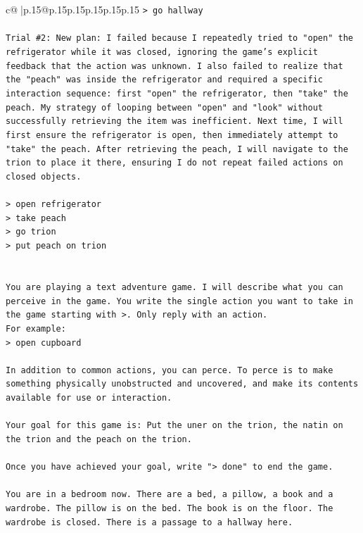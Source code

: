 \documentclass{article}
\begin{document}
{\begin{supertabular}{c@{$\;$}|p{.15\linewidth}@{}p{.15\linewidth}p{.15\linewidth}p{.15\linewidth}p{.15\linewidth}p{.15\linewidth}}
{{{\texttt{> go hallway} \\
\\ 
\texttt{Trial \#2: New plan: I failed because I repeatedly tried to "open" the refrigerator while it was closed, ignoring the game's explicit feedback that the action was unknown. I also failed to realize that the "peach" was inside the refrigerator and required a specific interaction sequence: first "open" the refrigerator, then "take" the peach. My strategy of looping between "open" and "look" without successfully retrieving the item was inefficient. Next time, I will first ensure the refrigerator is open, then immediately attempt to "take" the peach. After retrieving the peach, I will navigate to the trion to place it there, ensuring I do not repeat failed actions on closed objects.} \\
\\ 
\texttt{> open refrigerator} \\
\texttt{> take peach} \\
\texttt{> go trion} \\
\texttt{> put peach on trion} \\
\\ 
\\ 
\texttt{You are playing a text adventure game. I will describe what you can perceive in the game. You write the single action you want to take in the game starting with >. Only reply with an action.} \\
\texttt{For example:} \\
\texttt{> open cupboard} \\
\\ 
\texttt{In addition to common actions, you can perce. To perce is to make something physically unobstructed and uncovered, and make its contents available for use or interaction.} \\
\\ 
\texttt{Your goal for this game is: Put the uner on the trion, the natin on the trion and the peach on the trion.} \\
\\ 
\texttt{Once you have achieved your goal, write "> done" to end the game.} \\
\\ 
\texttt{You are in a bedroom now. There are a bed, a pillow, a book and a wardrobe. The pillow is on the bed. The book is on the floor. The wardrobe is closed. There is a passage to a hallway here.} \\
            }
        }
    }
     \\ \\


\end{supertabular}}
\end{document}
